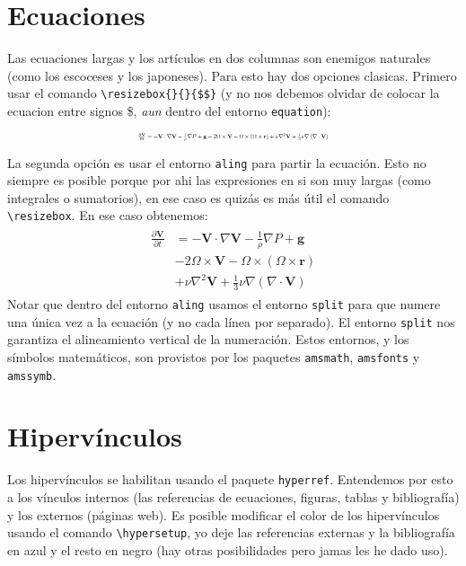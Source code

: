 \documentclass[a4paper,10pt,twocolumn,twoside]{article}
\begin{document}
\section{Ecuaciones}
Las ecuaciones largas y los artículos en dos columnas son enemigos naturales (como los escoceses y los japoneses). Para esto hay dos opciones clasicas. Primero usar el comando \verb+\resizebox{}{}{$$}+ (y no nos debemos olvidar de colocar la ecuacion entre signos \$, \emph{aun} dentro del entorno \texttt{equation}):

\begin{equation}
    \resizebox{0.44\textwidth}{!}{$\frac{\partial\mathbf{V}}{\partial t} = -\mathbf{V}\cdot\nabla\mathbf{V}-\frac{1}{\rho}\nabla P+\mathbf{g}-2\Omega\times\mathbf{V}-\Omega\times\left(\Omega\times\mathbf{r}\right)+\nu\nabla^2\mathbf{V}+\frac{1}{3}\nu\nabla\left(\nabla\cdot\mathbf{V}\right)$}
\end{equation}

La segunda opción es usar el entorno \texttt{aling} para partir la ecuación. Esto no siempre es posible porque por ahi las expresiones en si son muy largas (como integrales o sumatorios), en ese caso es quizás es más útil el comando \verb+\resizebox+. En ese caso obtenemos:
\begin{align}
\begin{split}
    \frac{\partial\mathbf{V}}{\partial t} & = -\mathbf{V}\cdot\nabla\mathbf{V}-\frac{1}{\rho}\nabla P+\mathbf{g} \\
     & - 2\Omega\times\mathbf{V}-\Omega\times\left(\Omega\times\mathbf{r}\right) \\
     & + \nu\nabla^2\mathbf{V}+\frac{1}{3}\nu\nabla\left(\nabla\cdot\mathbf{V}\right)
\end{split}
\end{align}
Notar que dentro del entorno \texttt{aling} usamos el entorno \texttt{split} para que numere una única vez a la ecuación (y no cada línea por separado). El entorno \texttt{split} nos garantiza el alineamiento vertical de la numeración. Estos entornos, y los símbolos matemáticos, son provistos por los paquetes \texttt{amsmath}, \texttt{amsfonts} y \texttt{amssymb}.

\section{Hipervínculos}

Los hipervínculos se habilitan usando el paquete \texttt{hyperref}. Entendemos por esto a los vínculos internos (las referencias de ecuaciones, figuras, tablas y bibliografía) y los externos (páginas web). Es posible modificar el color de los hipervínculos usando el comando \verb+\hypersetup+, yo deje las referencias externas y la bibliografía en azul y el resto en negro (hay otras posibilidades pero jamas les he dado uso).
\end{document}
